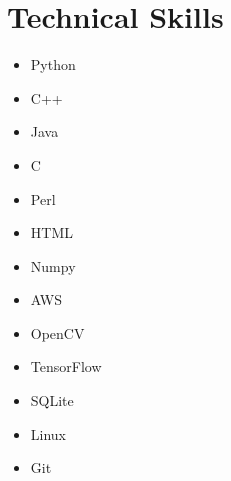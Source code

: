 \documentclass[]{deedy-resume-openfont}
\begin{document}
\begin{minipage}[t]{0.33\textwidth}



\section{\vspace{0cm}Technical Skills}

\begin{itemize}[nosep, wide=0pt, leftmargin=*, after=\strut]
\item Python
\item C++
\item Java
\item C
\item Perl
\item HTML
\item Numpy
\end{itemize} 
\begin{itemize}[nosep, wide=0pt, leftmargin=*, after=\strut]
\item AWS
\item OpenCV
\item TensorFlow
\item SQLite
\item Linux
\item Git
\end{itemize} 
\sectionsep

%
%

\end{minipage} 
\hfill
\end{document}
